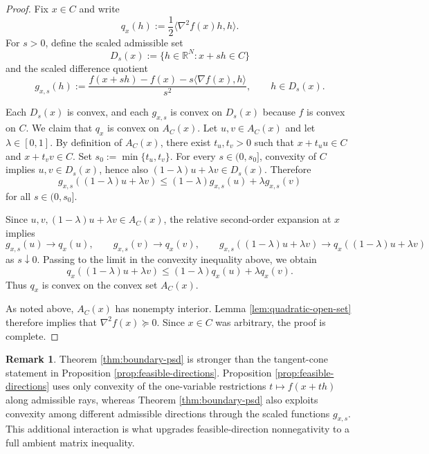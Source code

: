 \documentclass[reqno]{amsart}
\theoremstyle{definition}
\newtheorem{remark}[theorem]{Remark}
\newcommand{\R}{\mathbb{R}}
\newcommand{\inner}[2]{\langle #1,#2\rangle}
\begin{document}
\begin{proof}
Fix $x \in C$ and write
\begin{equation}
    q_x(h):=\dfrac12\inner{\nabla^2 f(x)h}{h}.
\end{equation}
For $s>0$, define the scaled admissible set
\begin{equation}
    D_s(x):=\{h \in \R^N : x+s h \in C\}
\end{equation}
and the scaled difference quotient
\begin{equation}
    g_{x,s}(h):=\frac{f(x+s h)-f(x)-s\inner{\nabla f(x)}{h}}{s^2},
    \qquad h \in D_s(x).
\end{equation}

Each $D_s(x)$ is convex, and each $g_{x,s}$ is convex on $D_s(x)$ because $f$ is
convex on $C$. We claim that $q_x$ is convex on $A_C(x)$. Let $u,v \in A_C(x)$ and
let $\lambda \in [0,1]$. By definition of $A_C(x)$, there exist $t_u,t_v>0$ such
that $x+t_u u \in C$ and $x+t_v v \in C$. Set $s_0:=\min\{t_u,t_v\}$. For every
$s \in (0,s_0]$, convexity of $C$ implies $u,v \in D_s(x)$, hence also
$(1-\lambda)u+\lambda v \in D_s(x)$. Therefore
\begin{equation}
    g_{x,s}((1-\lambda)u+\lambda v)
    \leq (1-\lambda)g_{x,s}(u)+\lambda g_{x,s}(v)
\end{equation}
for all $s \in (0,s_0]$.

Since $u,v,(1-\lambda)u+\lambda v \in A_C(x)$, the relative second-order expansion
at $x$ implies
\begin{equation}
    g_{x,s}(u) \to q_x(u), \qquad g_{x,s}(v) \to q_x(v), \qquad
    g_{x,s}((1-\lambda)u+\lambda v) \to q_x((1-\lambda)u+\lambda v)
\end{equation}
as $s \downarrow 0$. Passing to the limit in the convexity inequality above, we
obtain
\begin{equation}
    q_x((1-\lambda)u+\lambda v)
    \leq (1-\lambda)q_x(u)+\lambda q_x(v).
\end{equation}
Thus $q_x$ is convex on the convex set $A_C(x)$.

As noted above, $A_C(x)$ has nonempty interior. Lemma
\ref{lem:quadratic-open-set} therefore implies that
$\nabla^2 f(x) \succeq 0$. Since $x \in C$ was arbitrary, the proof is complete.
\end{proof}

\begin{remark}\label{rem:stronger-than-feasible}
Theorem \ref{thm:boundary-psd} is stronger than the tangent-cone statement in
Proposition \ref{prop:feasible-directions}. Proposition
\ref{prop:feasible-directions} uses only convexity of the one-variable
restrictions $t \mapsto f(x+t h)$ along admissible rays, whereas Theorem
\ref{thm:boundary-psd} also exploits convexity among different admissible
directions through the scaled functions $g_{x,s}$. This additional interaction is
what upgrades feasible-direction nonnegativity to a full ambient matrix
inequality.
\end{remark}
\end{document}
